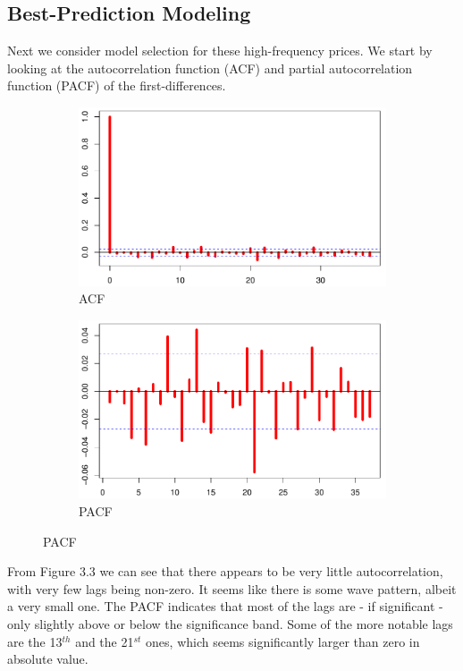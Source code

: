 \documentclass[a4paper]{article}
\theoremstyle{definition}
\begin{document}
\subsection{Best-Prediction Modeling}
Next we consider model selection for these high-frequency prices. We start by looking at the autocorrelation function (ACF) and partial autocorrelation function (PACF) of the first-differences. 
\begin{figure}[t]
     \centering
     \caption{Empirical (Partial) Autocorrelation Functions of the Gold Price FDs}
     \begin{subfigure}[t]{0.45\textwidth}
         \caption{ACF}        
         \includegraphics[width=\textwidth]{acfGOLDFD}
    \end{subfigure}
    \begin{subfigure}[t]{0.45\textwidth}
         \caption{PACF}
         \includegraphics[width=\textwidth]{pacfGOLDFD}
    \end{subfigure}
\end{figure}

From Figure 3.3 we can see that there appears to be very little autocorrelation, with very few lags being non-zero. It seems like there is some wave pattern, albeit a very small one. The PACF indicates that most of the lags are - if significant - only slightly above or below the significance band. Some of the more notable lags are the 13$^{th}$ and the 21$^{st}$ ones, which seems significantly larger than zero in absolute value. 
\end{document}
